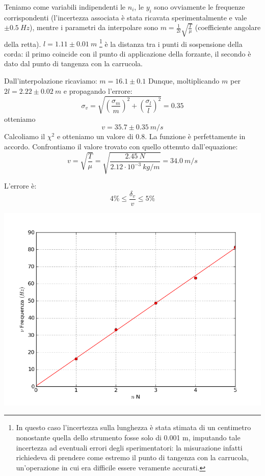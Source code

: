 Teniamo come variabili indipendenti le $n_i$, le $y_i$ sono ovviamente le frequenze corrispondenti (l'incertezza associata è stata ricavata sperimentalmente e vale $\pm0.5\ Hz$), mentre i parametri da interpolare sono $m=\frac{1}{2l}\sqrt{\frac{T}{\mu}}$ (coefficiente angolare della retta).
$l=1.11\pm0.01\ m$ \footnote{In questo caso l'incertezza sulla lunghezza è stata stimata di un centimetro nonostante quella dello strumento fosse solo di 0.001 m, imputando tale incertezza ad eventuali errori degli sperimentatori: la misurazione infatti richiedeva di prendere come estremo il punto di tangenza con la carrucola, un'operazione in cui era difficile essere veramente accurati.}
è la distanza tra i punti di sospensione della corda: il primo coincide con il punto di applicazione della forzante, il secondo è dato dal punto di tangenza con la carrucola.  

Dall'interpolazione ricaviamo: $m=16.1\pm0.1$ Dunque, moltiplicando $m$ per $2l=2.22\pm0.02\ m$ e propagando l'errore:
$$\sigma_v=\sqrt{\left(\frac{\sigma_m}{m}\right)^2+\left(\frac{\sigma_l}{l}\right)^2}=0.35$$
otteniamo $$v=35.7\pm0.35\ m/s$$ 
Calcoliamo il  $\chi^2$ e otteniamo un valore di $0.8$. La funzione è perfettamente in accordo.  
Confrontiamo il valore trovato con quello ottenuto dall'equazione:
$$v=\sqrt{\frac{T}{\mu}}=\sqrt{\frac{2.45\ N}{2.12 \cdot10^{-3}\ kg/m}}=34.0\ m/s$$

L'errore è:
$$4\% \leq \frac{\delta_v}{v} \leq 5\% $$




\begin{center}

\includegraphics[scale=0.5]{../grafici/corda_1armonica}
\end{center}


